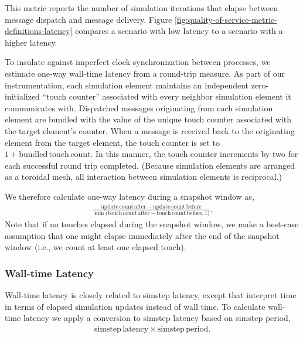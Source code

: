 This metric reports the number of simulation iterations that elapse between message dispatch and message delivery.
Figure \ref{fig:quality-of-service-metric-definitions-latency} compares a scenario with low latency to a scenario with a higher latency.

To insulate against imperfect clock synchronization between processes, we estimate one-way wall-time latency from a round-trip measure.
As part of our instrumentation, each simulation element maintains an independent zero-initialized ``touch counter'' associated with every neighbor simulation element it communicates with.
Dispatched messages originating from each simulation element are bundled with the value of the unique touch counter associated with the target element's counter.
When a message is received back to the originating element from the target element, the touch counter is set to $1 + \mathrm{bundled\,touch\,count}$.
In this manner, the touch counter increments by two for each successful round trip completed.
(Because simulation elements are arranged as a toroidal mesh, all interaction between simulation elements is reciprocal.)

We therefore calculate one-way latency during a snapshot window as,
\begin{align*}
  \frac{
    \mathrm{update\,count\,after} - \mathrm{update\,count\,before}
  }{
    \min\Big( \mathrm{ touch\,count\,after } - \mathrm{ touch\,count\,before }, 1 \Big)
  }.
\end{align*}
Note that if no touches elapsed during the snapshot window, we make a best-case assumption that one might elapse immediately after the end of the snapshot window (i.e., we count at least one elapsed touch).


\subsubsection{Wall-time Latency} \label{sec:simulation-time-latency-metric}

Wall-time latency is closely related to simstep latency, except that interpret time in terms of elapsed simulation updates instead of wall time.
To calculate wall-time latency we apply a conversion to simstep latency based on simstep period,
\begin{align*}
  \mathrm{simstep\,latency} \times \mathrm{simstep\,period}.
\end{align*}

